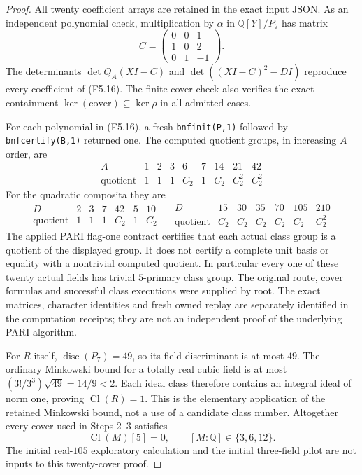 \begin{proof}
All twenty coefficient arrays are retained in the exact input
JSON. As an independent polynomial check, multiplication by
$\alpha$ in $\mathbb Q[Y]/P_7$ has matrix
\[
                     C=\begin{pmatrix}0&0&1\\1&0&2\\0&1&-1\end{pmatrix}.
 \tag{F5.17}
\]
The determinants $\det Q_A(XI-C)$ and
$\det((XI-C)^2-DI)$ reproduce every coefficient of (F5.16).
The finite cover check also verifies the exact containment
$\ker(\text{cover})\subseteq\ker\rho$ in all admitted cases.

For each polynomial in (F5.16), a fresh \texttt{bnfinit(P,1)}
followed by \texttt{bnfcertify(B,1)} returned one.
The computed quotient groups, in increasing $A$ order, are
\[
 \begin{array}{c|rrrrrrrr}
 A&1&2&3&6&7&14&21&42\\\hline
 \text{quotient}&1&1&1&C_2&1&C_2&C_2^2&C_2^2
 \end{array}\tag{F5.18}
\]
For the quadratic composita they are
\[
 \begin{array}{c|rrrrrr}
 D&2&3&7&42&5&10\\\hline
 \text{quotient}&1&1&1&C_2&1&C_2
 \end{array}
 \quad
 \begin{array}{c|rrrrrr}
 D&15&30&35&70&105&210\\\hline
 \text{quotient}&C_2&C_2&C_2&C_2&C_2&C_2^2
 \end{array}\tag{F5.19}
\]
The applied PARI flag-one contract certifies that each actual
class group is a quotient of the displayed group. It does not
certify a complete unit basis or equality with a nontrivial
computed quotient. In particular every one of these twenty
actual fields has trivial $5$-primary class group.
The original route, cover formulas and successful class
executions were supplied by root. The exact matrices,
character identities and fresh owned replay are separately
identified in the computation receipts; they are not an
independent proof of the underlying PARI algorithm.

For $R$ itself, $\operatorname{disc}(P_7)=49$, so its field
discriminant is at most $49$. The ordinary Minkowski bound
for a totally real cubic field is at most
$(3!/3^3)\sqrt{49}=14/9<2$.
Each ideal class therefore contains an integral ideal of norm
one, proving $\operatorname{Cl}(R)=1$.
This is the elementary application of the retained Minkowski
bound, not a use of a candidate class number.
Altogether every cover used in Steps 2--3 satisfies
\[
                     \operatorname{Cl}(M)[5]=0,
              \qquad [M:\mathbb Q]\in\{3,6,12\}.
 \tag{F5.20}
\]
The initial real-$105$ exploratory calculation and the initial
three-field pilot are not inputs to this twenty-cover proof.


\end{proof}
